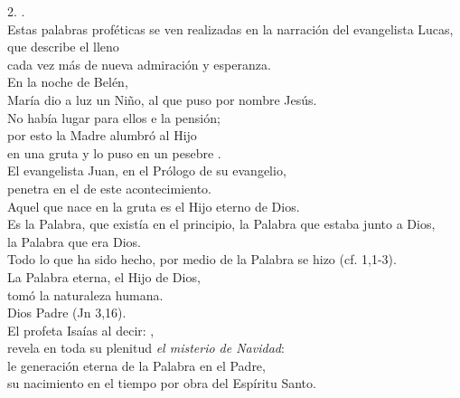 2. .\\ Estas palabras proféticas se ven realizadas en la narración del evangelista Lucas,~\\ que describe el  lleno\\ cada vez más de nueva admiración y esperanza.\\ En la noche de Belén,\\ María dio a luz un Niño, al que puso por nombre Jesús.\\ No había lugar para ellos e la pensión;\\ por esto la Madre alumbró al Hijo\\ en una gruta y lo puso en un pesebre .\\ El evangelista Juan, en el Prólogo de su evangelio,\\ penetra en el  de este acontecimiento.\\ Aquel que nace en la gruta es el Hijo eterno de Dios.\\ Es la Palabra, que existía en el principio, la Palabra que estaba junto a Dios,\\ la Palabra que era Dios.\\ Todo lo que ha sido hecho, por medio de la Palabra se hizo (cf. 1,1-3).\\ La Palabra eterna, el Hijo de Dios,\\ tomó la naturaleza humana.\\ Dios Padre  (Jn 3,16).\\ El profeta Isaías al decir: ,\\ revela en toda su plenitud \emph{el misterio de Navidad}:\\ le generación eterna de la Palabra en el Padre,\\ su nacimiento en el tiempo por obra del Espíritu Santo.


